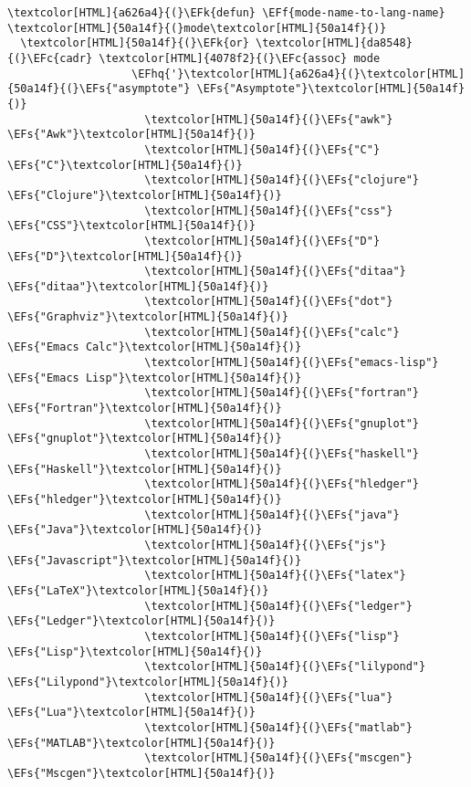 \documentclass{scrartcl}
\newcommand{\EFk}[1]{\textcolor{EFk}{#1}} %
\newcommand{\EFs}[1]{\textcolor{EFs}{#1}} %
\newcommand{\EFc}[1]{\textcolor{EFc}{#1}} %
\newcommand{\EFf}[1]{\textcolor{EFf}{#1}} %
\newcommand{\EFhq}[1]{\textcolor{EFhq}{#1}} %
\begin{document}
\begin{Code}
\begin{Verbatim}[]
\textcolor[HTML]{a626a4}{(}\EFk{defun} \EFf{mode-name-to-lang-name} \textcolor[HTML]{50a14f}{(}mode\textcolor[HTML]{50a14f}{)}
  \textcolor[HTML]{50a14f}{(}\EFk{or} \textcolor[HTML]{da8548}{(}\EFc{cadr} \textcolor[HTML]{4078f2}{(}\EFc{assoc} mode
                   \EFhq{'}\textcolor[HTML]{a626a4}{(}\textcolor[HTML]{50a14f}{(}\EFs{"asymptote"} \EFs{"Asymptote"}\textcolor[HTML]{50a14f}{)}
                     \textcolor[HTML]{50a14f}{(}\EFs{"awk"} \EFs{"Awk"}\textcolor[HTML]{50a14f}{)}
                     \textcolor[HTML]{50a14f}{(}\EFs{"C"} \EFs{"C"}\textcolor[HTML]{50a14f}{)}
                     \textcolor[HTML]{50a14f}{(}\EFs{"clojure"} \EFs{"Clojure"}\textcolor[HTML]{50a14f}{)}
                     \textcolor[HTML]{50a14f}{(}\EFs{"css"} \EFs{"CSS"}\textcolor[HTML]{50a14f}{)}
                     \textcolor[HTML]{50a14f}{(}\EFs{"D"} \EFs{"D"}\textcolor[HTML]{50a14f}{)}
                     \textcolor[HTML]{50a14f}{(}\EFs{"ditaa"} \EFs{"ditaa"}\textcolor[HTML]{50a14f}{)}
                     \textcolor[HTML]{50a14f}{(}\EFs{"dot"} \EFs{"Graphviz"}\textcolor[HTML]{50a14f}{)}
                     \textcolor[HTML]{50a14f}{(}\EFs{"calc"} \EFs{"Emacs Calc"}\textcolor[HTML]{50a14f}{)}
                     \textcolor[HTML]{50a14f}{(}\EFs{"emacs-lisp"} \EFs{"Emacs Lisp"}\textcolor[HTML]{50a14f}{)}
                     \textcolor[HTML]{50a14f}{(}\EFs{"fortran"} \EFs{"Fortran"}\textcolor[HTML]{50a14f}{)}
                     \textcolor[HTML]{50a14f}{(}\EFs{"gnuplot"} \EFs{"gnuplot"}\textcolor[HTML]{50a14f}{)}
                     \textcolor[HTML]{50a14f}{(}\EFs{"haskell"} \EFs{"Haskell"}\textcolor[HTML]{50a14f}{)}
                     \textcolor[HTML]{50a14f}{(}\EFs{"hledger"} \EFs{"hledger"}\textcolor[HTML]{50a14f}{)}
                     \textcolor[HTML]{50a14f}{(}\EFs{"java"} \EFs{"Java"}\textcolor[HTML]{50a14f}{)}
                     \textcolor[HTML]{50a14f}{(}\EFs{"js"} \EFs{"Javascript"}\textcolor[HTML]{50a14f}{)}
                     \textcolor[HTML]{50a14f}{(}\EFs{"latex"} \EFs{"LaTeX"}\textcolor[HTML]{50a14f}{)}
                     \textcolor[HTML]{50a14f}{(}\EFs{"ledger"} \EFs{"Ledger"}\textcolor[HTML]{50a14f}{)}
                     \textcolor[HTML]{50a14f}{(}\EFs{"lisp"} \EFs{"Lisp"}\textcolor[HTML]{50a14f}{)}
                     \textcolor[HTML]{50a14f}{(}\EFs{"lilypond"} \EFs{"Lilypond"}\textcolor[HTML]{50a14f}{)}
                     \textcolor[HTML]{50a14f}{(}\EFs{"lua"} \EFs{"Lua"}\textcolor[HTML]{50a14f}{)}
                     \textcolor[HTML]{50a14f}{(}\EFs{"matlab"} \EFs{"MATLAB"}\textcolor[HTML]{50a14f}{)}
                     \textcolor[HTML]{50a14f}{(}\EFs{"mscgen"} \EFs{"Mscgen"}\textcolor[HTML]{50a14f}{)}

\end{Verbatim}
\end{Code}
\end{document}
